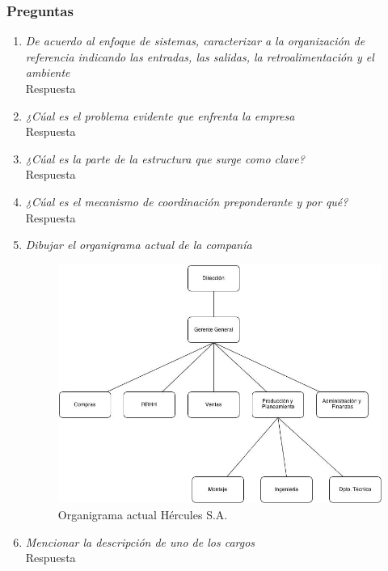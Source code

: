 \documentclass[a4paper,10pt]{article}
\begin{document}
		\subsubsection{Preguntas}
			\begin{enumerate}
		
			\item \textit{ De acuerdo al enfoque de sistemas, caracterizar a la organización de referencia indicando las entradas, las salidas, la retroalimentación y el ambiente}\\
			Respuesta		
			
			\item \textit{¿Cúal es el problema evidente que enfrenta la empresa}\\
			Respuesta			
			
			\item \textit{¿Cúal es la parte de la estructura que surge como clave?}\\
			Respuesta
			
			\item \textit{¿Cúal es el mecanismo de coordinación preponderante y por qué?}\\
			Respuesta
						
			\item \textit{Dibujar el organigrama actual de la companía}\\
				\begin{figure}[H]
					\centering
					\includegraphics[width=13cm]{imagenes/orgHerc.jpg}
					\caption{Organigrama actual Hércules S.A.}
				\end{figure}
						
			\item \textit{Mencionar la descripción de uno de los cargos}\\
			Respuesta
						

\end{enumerate}
\end{document}
